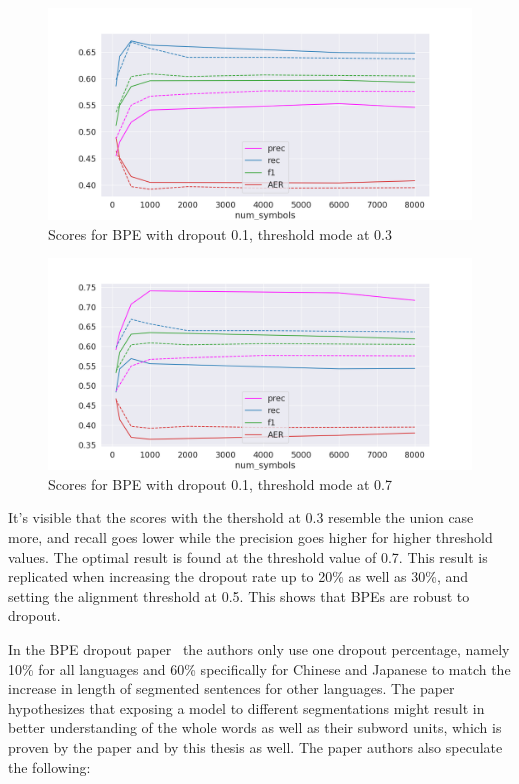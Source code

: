 \begin{figure}[!ht]
    \centering
    \includegraphics[width=11.5cm]{../reports/scores_dropout_bpe/space/0.1/0.3_thres_fastalign.png}
    \caption{Scores for BPE with dropout 0.1, threshold mode at 0.3}
\end{figure}

\begin{figure}[!ht]
    \centering
    \includegraphics[width=11.5cm]{../reports/scores_dropout_bpe/space/0.1/0.7_thres_fastalign.png}
    \caption{Scores for BPE with dropout 0.1, threshold mode at 0.7}
\end{figure}

It's visible that the scores with the thershold at 0.3 resemble the union case more, and recall goes lower while the precision goes higher for higher threshold values. The optimal result is found at the threshold value of 0.7. This result is replicated when increasing the dropout rate up to 20\% as well as 30\%, and setting the alignment threshold at 0.5. This shows that BPEs are robust to dropout.

In the BPE dropout paper~\cite{provilkov2019bpedropout} the authors only use one dropout percentage, namely 10\% for all languages and 60\% specifically for Chinese and Japanese to match the increase in length of segmented sentences for other languages. The paper hypothesizes that exposing a model to different segmentations might result in better understanding of the whole words as well as their subword units, which is proven by the paper and by this thesis as well. The paper authors also speculate the following:

